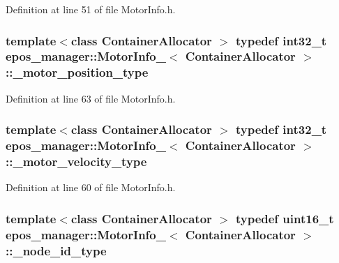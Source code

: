 \-Definition at line 51 of file \-Motor\-Info.\-h.

\subsubsection[{\-\_\-motor\-\_\-position\-\_\-type}]{\setlength{\rightskip}{0pt plus 5cm}template$<$class Container\-Allocator $>$ typedef int32\-\_\-t {\bf epos\-\_\-manager\-::\-Motor\-Info\-\_\-}$<$ \-Container\-Allocator $>$\-::{\bf \-\_\-motor\-\_\-position\-\_\-type}}\label{structepos__manager_1_1MotorInfo___a4a1d979a401e24bda5797a400eee8019}


\-Definition at line 63 of file \-Motor\-Info.\-h.

\subsubsection[{\-\_\-motor\-\_\-velocity\-\_\-type}]{\setlength{\rightskip}{0pt plus 5cm}template$<$class Container\-Allocator $>$ typedef int32\-\_\-t {\bf epos\-\_\-manager\-::\-Motor\-Info\-\_\-}$<$ \-Container\-Allocator $>$\-::{\bf \-\_\-motor\-\_\-velocity\-\_\-type}}\label{structepos__manager_1_1MotorInfo___a1c7c2e7c3125883bfc18f0d7dc6777bf}


\-Definition at line 60 of file \-Motor\-Info.\-h.

\subsubsection[{\-\_\-node\-\_\-id\-\_\-type}]{\setlength{\rightskip}{0pt plus 5cm}template$<$class Container\-Allocator $>$ typedef uint16\-\_\-t {\bf epos\-\_\-manager\-::\-Motor\-Info\-\_\-}$<$ \-Container\-Allocator $>$\-::{\bf \-\_\-node\-\_\-id\-\_\-type}}\label{structepos__manager_1_1MotorInfo___a8ad13a57c56281dfd1f2c4a7ba41e16e}


